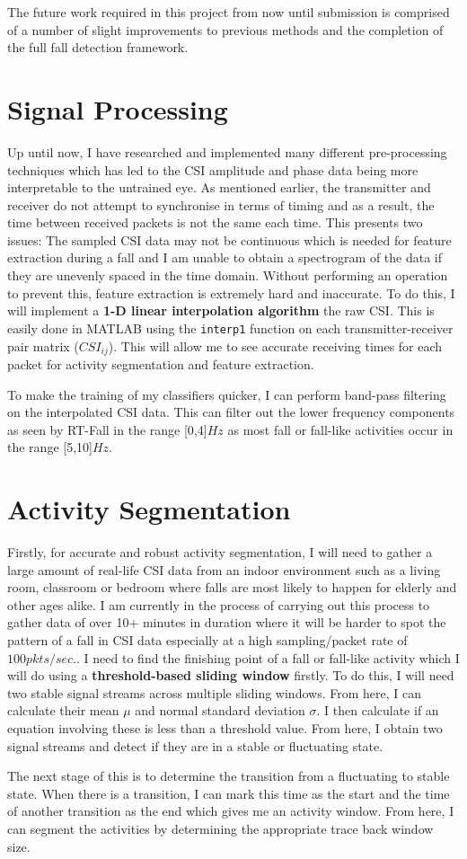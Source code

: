 The future work required in this project from now until submission is comprised of a number of slight improvements to previous methods and the completion of the full fall detection framework. 
\section{Signal Processing}
Up until now, I have researched and implemented many different pre-processing techniques which has led to the CSI amplitude and phase data being more interpretable to the untrained eye. As mentioned earlier, the transmitter and receiver do not attempt to synchronise in terms of timing and as a result, the time between received packets is not the same each time. This presents two issues: The sampled CSI data may not be continuous which is needed for feature extraction during a fall and I am unable to obtain a spectrogram of the data if they are unevenly spaced in the time domain. Without performing an operation to prevent this, feature extraction is extremely hard and inaccurate. To do this, I will implement a \textbf{ 1-D linear interpolation algorithm} the raw CSI. This is easily done in MATLAB using the \lstinline{interp1} function on each transmitter-receiver pair matrix ($CSI_{ij}$). This will allow me to see accurate receiving times for each packet for activity segmentation and feature extraction. \par
To make the training of my classifiers quicker, I can perform band-pass filtering on the interpolated CSI data. This can filter out the lower frequency components as seen by RT-Fall in the range [0,4]$Hz$ as most fall or fall-like activities occur in the range [5,10]$Hz$. 
\section{Activity Segmentation}
Firstly, for accurate and robust activity segmentation, I will need to gather a large amount of real-life CSI data from an indoor environment such as a living room, classroom or bedroom where falls are most likely to happen for elderly and other ages alike. I am currently in the process of carrying out this process to gather data of over 10+ minutes in duration where it will be harder to spot the pattern of a fall in CSI data especially at a high sampling/packet rate of $100pkts/sec.$. I need to find the finishing point of a fall or fall-like activity which I will do using a \textbf{threshold-based sliding window} firstly. To do this, I will need two stable signal streams across multiple sliding windows. From here, I can calculate their mean $\mu$ and normal standard deviation $\sigma$. I then calculate if an equation involving these is less than a threshold value. From here, I obtain two signal streams and detect if they are in a stable or fluctuating state. \par
The next stage of this is to determine the transition from a fluctuating to stable state. When there is a transition, I can mark this time as the start and the time of another transition as the end which gives me an activity window. From here, I can segment the activities by determining the appropriate trace back window size. 
